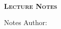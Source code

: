 
\thispagestyle{empty}
\clearpage
\setcounter{page}{-1}

\makeatletter
\begin{titlepage}
{
    \centering
    \null%
    \vspace{13em}
    {\Huge \bfseries \@title \\[1em]
      \Large \scshape Lecture Notes
    \par}
    \vspace{2em}
    {\large \scshape \@date \par}
    \vfill
\begin{center}
\end{center}
    \vspace{5em}

    \vfill
    {\raggedleft \large Notes Author: \@author \par}
}
\end{titlepage}
\makeatother
